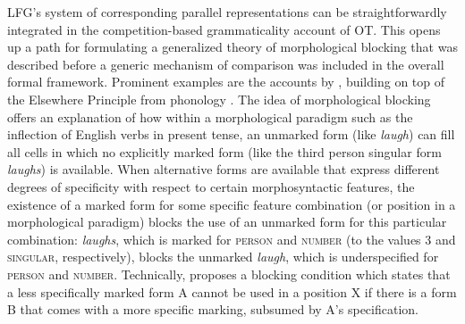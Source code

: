 \documentclass[output=paper,hidelinks]{langscibook}
\begin{document}
LFG's system of corresponding parallel representations can be straightforwardly integrated in the competition-based grammaticality account of OT. This opens up a path for formulating a generalized theory of morphological blocking that was described before a generic mechanism of comparison was included in the overall formal framework. Prominent examples are the accounts by \citet{Andrews82,Andrews90}, building on top of the Elsewhere Principle from phonology \citep{Anderson1969}. The idea of morphological blocking offers an explanation of how within a morphological paradigm such as the inflection of English verbs in pres\-ent tense, an unmarked form (like \emph{laugh}) can fill all cells in which no explicitly marked form (like the third person singular form \emph{laughs}) is available. When alternative forms are available that express different degrees of specificity with respect to certain morphosyntactic features, the existence of a marked form for some specific feature combination (or position in a morphological paradigm) blocks the use of an unmarked form for this particular combination: \emph{laughs}, which is marked for \textsc{person} and \textsc{number} (to the values 3 and \textsc{singular}, respectively), blocks the unmarked \emph{laugh}, which is underspecified for \textsc{person} and \textsc{number}. Technically, \citet{Andrews82} proposes a blocking condition which states that a less specifically marked form A cannot be used in a position X if there is a form B that comes with a more specific marking, subsumed by A's specification. %
\end{document}
